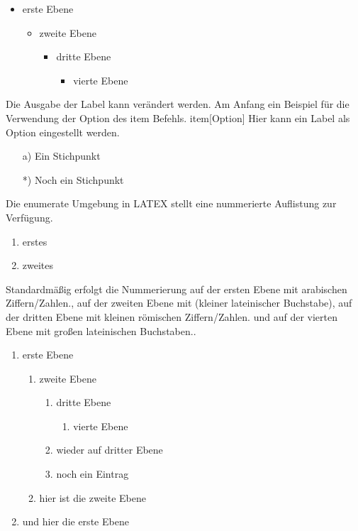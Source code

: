 \begin{itemize}
\item erste Ebene
\begin{itemize}
\item zweite Ebene
\begin{itemize}
\item dritte Ebene
\begin{itemize}
\item vierte Ebene
\end{itemize}
\end{itemize}
\end{itemize}
\end{itemize}

Die Ausgabe der Label kann verändert werden. Am Anfang ein Beispiel für die Verwendung der Option des item Befehls. item[Option] Hier kann ein Label als Option eingestellt werden. 

\begin{itemize}
\item[a)] Ein Stichpunkt
\item[*)] Noch ein Stichpunkt
\end{itemize}

Die enumerate Umgebung in LATEX stellt eine nummerierte Auflistung zur Verfügung. 

\begin{enumerate}
\item erstes 
\item zweites 
\end{enumerate}

Standardmäßig erfolgt die Nummerierung auf der ersten Ebene mit arabischen Ziffern/Zahlen., auf der zweiten Ebene mit (kleiner lateinischer Buchstabe), auf der dritten Ebene mit kleinen römischen Ziffern/Zahlen. und auf der vierten Ebene mit großen lateinischen Buchstaben.. 

\begin{enumerate}
\item erste Ebene
\begin{enumerate}
\item zweite Ebene
\begin{enumerate}
\item dritte Ebene
\begin{enumerate}
\item vierte Ebene
\end{enumerate}
\item wieder auf dritter Ebene 
\item noch ein Eintrag 
\end{enumerate}
\item hier ist die zweite Ebene
\end{enumerate}
\item und hier die erste Ebene
\end{enumerate}



